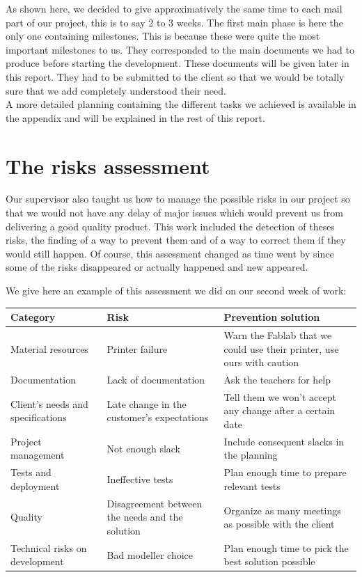 \documentclass{report}
\begin{document}
As shown here, we decided to give approximatively the same time to each mail part of our project, this is to say 2 to 3 weeks. The first main phase is here the only one containing milestones. This is because these were quite the most important milestones to us. They corresponded to the main documents we had to produce before starting the development. These documents will be given later in this report. They had to be submitted to the client so that we would be totally sure that we add completely understood their need. \\

A more detailed planning containing the different tasks we achieved is available in the appendix and will be explained in the rest of this report.

\section{The risks assessment}

Our supervisor also taught us how to manage the possible risks in our project so that we would not have any delay of major issues which would prevent us from delivering a good quality product. This work included the detection of theses risks, the finding of a way to prevent them and of a way to correct them if they would still happen. Of course, this assessment changed as time went by since some of the risks disappeared or actually happened and new appeared.

We give here an example of this assessment we did on our second week of work:

\begin{tabular}{|p{4cm}|p{5cm}|p{5cm}|}
\hline
Category & Risk & Prevention solution \\ \hline
Material resources & Printer failure & Warn the Fablab that we could use their printer, use ours with caution \\
Documentation & Lack of documentation & Ask the teachers for help \\
Client's needs and specifications & Late change in the customer's expectations & Tell them we won't accept any change after a certain date \\
Project management & Not enough slack & Include consequent slacks in the planning \\
Tests and deployment & Ineffective tests & Plan enough time to prepare relevant tests \\
Quality & Disagreement between the needs and the solution & Organize as many meetings as possible with the client \\
Technical risks on development & Bad modeller choice & Plan enough time to pick the best solution possible \\
\hline
\end{tabular}
\end{document}
